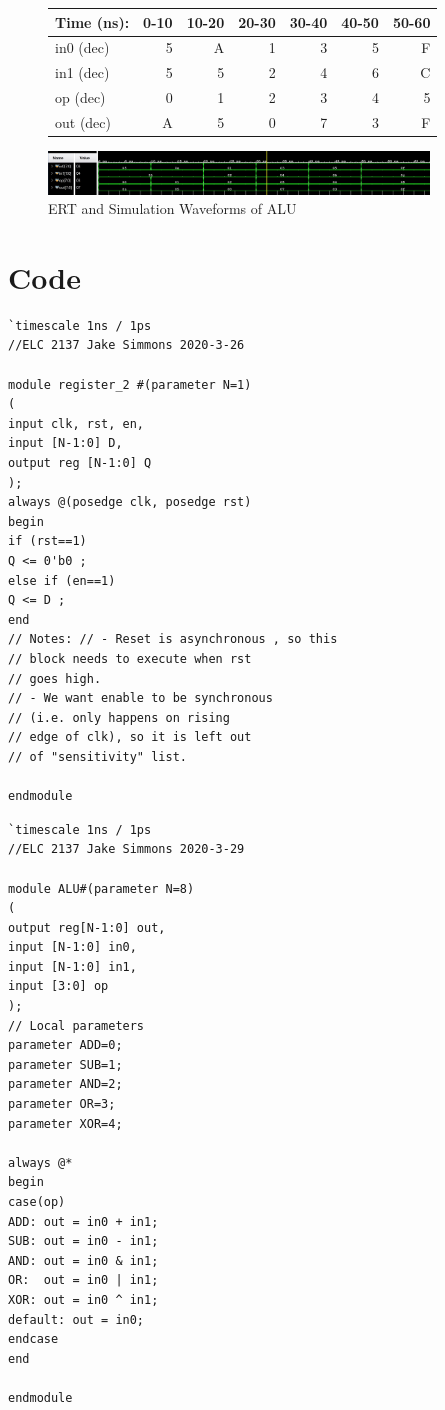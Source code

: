 \documentclass[11pt]{article}
\begin{document}
\begin{figure}[ht]\centering
	\begin{tabular}{l|rrrrrr}
		Time (ns): & 0-10 & 10-20 & 20-30 & 30-40 & 40-50 & 50-60  \\
		\midrule
		in0 (dec) & 5 & A & 1 & 3 & 5 & F \\
		in1 (dec) & 5 & 5 & 2 & 4 & 6 & C \\
		op (dec) & 0 & 1 & 2 & 3 & 4 & 5 \\
		\midrule 
		out (dec) & A & 5 & 0 & 7 & 3 & F \\
		\bottomrule
	\end{tabular}\medskip
	
		\includegraphics[width=0.9\textwidth]{ALU_test.JPG}
		\caption{ERT and Simulation Waveforms of ALU}
		\label{fig:sim_with_table}
\end{figure}


\clearpage
\section*{Code}

\begin{lstlisting}[style=Verilog,
caption=Direct Verilog code example,
label=code:ex 
]
`timescale 1ns / 1ps
//ELC 2137 Jake Simmons 2020-3-26

module register_2 #(parameter N=1) 
(
input clk, rst, en, 
input [N-1:0] D, 
output reg [N-1:0] Q 
);
always @(posedge clk, posedge rst) 
begin       
if (rst==1) 
Q <= 0'b0 ; 
else if (en==1) 
Q <= D ; 
end
// Notes: // - Reset is asynchronous , so this 
// block needs to execute when rst 
// goes high.
// - We want enable to be synchronous 
// (i.e. only happens on rising 
// edge of clk), so it is left out 
// of "sensitivity" list.

endmodule

\end{lstlisting}

\begin{lstlisting}[style=Verilog,
caption=Direct Verilog code example,
label=code:ex 
]
`timescale 1ns / 1ps
//ELC 2137 Jake Simmons 2020-3-29

module ALU#(parameter N=8) 
( 
output reg[N-1:0] out, 
input [N-1:0] in0, 
input [N-1:0] in1, 
input [3:0] op 
);
// Local parameters 
parameter ADD=0; 
parameter SUB=1; 
parameter AND=2; 
parameter OR=3; 
parameter XOR=4;

always @* 
begin 
case(op) 
ADD: out = in0 + in1; 
SUB: out = in0 - in1;
AND: out = in0 & in1;
OR:  out = in0 | in1;
XOR: out = in0 ^ in1;
default: out = in0; 
endcase 
end

endmodule

\end{lstlisting}
\end{document}
